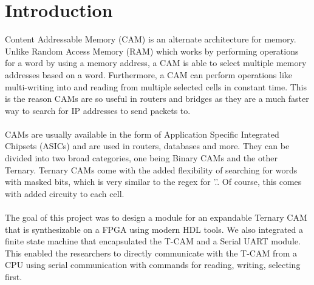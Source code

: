 \section{Introduction}
Content Addressable Memory (CAM) is an alternate architecture for memory. Unlike Random Access Memory (RAM) which works by 
performing operations for a word by using a memory address, a CAM is able to select multiple memory addresses based on a word. 
Furthermore, a CAM can perform operations like multi-writing into and reading from multiple selected cells in constant time.
This is the reason CAMs are so useful in routers and bridges as they are a much faster way to search for IP addresses to send packets to.
\\\\  
CAMs are usually available in the form of Application Specific Integrated Chipsets (ASICs) and are used in routers, databases and more.
They can be divided into two broad categories, one being Binary CAMs and the other Ternary. 
Ternary CAMs come with the added flexibility of searching for words with masked bits, which is very similar to the regex for '.'. 
Of course, this comes with added circuity to each cell. 
\\\\ 
The goal of this project was to design a module for an expandable Ternary CAM that is synthesizable on a FPGA using modern HDL tools. 
We also integrated a finite state machine that encapsulated the T-CAM and a Serial UART module. 
This enabled the researchers to directly communicate with the T-CAM from a CPU using serial communication with commands for reading, writing, selecting first. 
